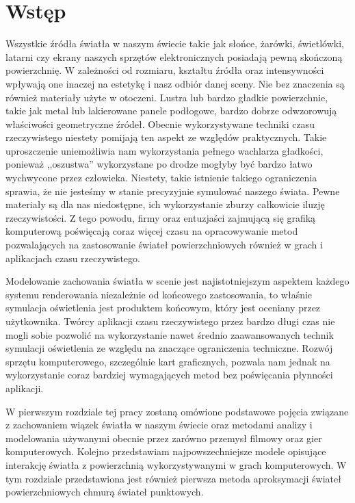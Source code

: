 \documentclass[../main.tex]{subfiles}
\begin{document}
\chapter*{Wstęp}

Wszystkie źródła światła w naszym świecie takie jak słońce, żarówki, świetlówki, latarni czy ekrany naszych sprzętów elektronicznych posiadają pewną skończoną powierzchnię. W zależności od rozmiaru, kształtu źródła oraz intensywności wpływają one inaczej na estetykę i nasz odbiór danej sceny. Nie bez znaczenia są również materiały użyte w otoczeni. Lustra lub bardzo gładkie powierzchnie, takie jak metal lub lakierowane panele podłogowe, bardzo dobrze odwzorowują właściwości geometryczne źródeł. Obecnie wykorzystywane techniki czasu rzeczywistego niestety pomijają ten aspekt ze względów praktycznych. Takie uproszczenie uniemożliwia nam wykorzystania pełnego wachlarza gładkości, ponieważ ,,oszustwa'' wykorzystane po drodze mogłyby być bardzo łatwo wychwycone przez człowieka. Niestety, takie istnienie takiego ograniczenia sprawia, że nie jesteśmy w stanie precyzyjnie symulować naszego świata. Pewne materiały są dla nas niedostępne, ich wykorzystanie zburzy całkowicie iluzję rzeczywistości. Z tego powodu, firmy oraz entuzjaści zajmującą się grafiką komputerową poświęcają coraz więcej czasu na opracowywanie metod pozwalających na zastosowanie świateł powierzchniowych również w grach i aplikacjach czasu rzeczywistego. 

Modelowanie zachowania światła w scenie jest najistotniejszym aspektem każdego systemu renderowania niezależnie od końcowego zastosowania, to właśnie symulacja oświetlenia jest produktem końcowym, który jest oceniany przez użytkownika. Twórcy aplikacji czasu rzeczywistego przez bardzo długi czas nie mogli sobie pozwolić na wykorzystanie nawet średnio zaawansowanych technik symulacji oświetlenia ze względu na znaczące ograniczenia techniczne. Rozwój sprzętu komputerowego, szczególnie kart graficznych, pozwala nam jednak na wykorzystanie coraz bardziej wymagających metod bez poświęcania płynności aplikacji.

W pierwszym rozdziale tej pracy zostaną omówione podstawowe pojęcia związane z zachowaniem wiązek światła w naszym świecie oraz metodami analizy i modelowania używanymi obecnie przez zarówno przemysł filmowy oraz gier komputerowych. Kolejno przedstawiam najpowszechniejsze modele opisujące interakcję światła z powierzchnią wykorzystywanymi w grach komputerowych. W tym rozdziale przedstawiona jest również pierwsza metoda aproksymacji świateł powierzchniowych chmurą świateł punktowych.
\end{document}
